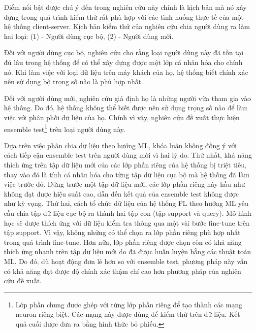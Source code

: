 Điểm nối bật được chú ý đến trong nghiên cứu này chính là kịch bản mà nó xây dựng trong quá trình kiểm thử rất phù hợp với các tình huống thực tế của một hệ thống client-server. Kịch bản kiểm thử của nghiên cứu \cite{liang2020think} chia người dùng ra làm hai loại: (1) - Người dùng cục bộ, (2) - Người dùng mới.

Đối với người dùng cục bộ, nghiên cứu cho rằng loại người dùng này đã tồn tại đủ lâu trong hệ thống để có thể xây dựng được một lớp cá nhân hóa cho chính nó. Khi làm việc với loại dữ liệu trên máy khách của họ, hệ thống biết chính xác nên sử dụng bộ trọng số nào là phù hợp nhất.

\label{ensemble_test}
Đối với người dùng mới, nghiên cứu giả định họ là những người vừa tham gia vào hệ thống. Do đó, hệ thống không thể biết được nên sử dụng trọng số nào để làm việc với phân phối dữ liệu của họ. Chính vì vậy, nghiên cứu đề xuất thực hiện ensemble test\footnote{Lớp phần chung được ghép với từng lớp phần riêng để tạo thành các mạng neuron riêng biệt. Các mạng này được dùng để kiểm thử trên dữ liệu. Kết quả cuối được đưa ra bằng hình thức bỏ phiếu.} trên loại người dùng này.

Dựa trên việc phân chia dữ liệu theo hướng ML, khóa luận không đồng ý với cách tiếp cận ensemble test trên người dùng mới vì hai lý do. Thứ nhất, khả năng thích ứng trên tập dữ liệu mới của các lớp phần riêng của hệ thống bị triệt tiêu, thay vào đó là tính cá nhân hóa cho từng tập dữ liệu cục bộ mà hệ thống đã làm việc trước đó. Đứng trước một tập dữ liệu mới, các lớp phần riêng này hầu như không đạt được hiệu suất cao, dẫn đến kết quả của ensemble test không được như kỳ vọng. Thứ hai, cách tổ chức dữ liệu của hệ thống FL theo hướng ML yêu cầu chia tập dữ liệu cục bộ ra thành hai tập con (tập support và query). Mô hình học sẽ được thích ứng với dữ liệu kiểm tra thông qua một vài bước fine-tune trên tập support. Vì vậy, không những có thể chọn ra lớp phần riêng phù hợp nhất trong quá trình fine-tune. Hơn nữa, lớp phần riêng được chọn còn có khả năng thích ứng nhanh trên tập dữ liệu mới do đã được huấn luyện bằng các thuật toán ML. Do đó, dù hoạt động đơn lẻ hơn so với ensemble test, phương pháp này vẫn có khả năng đạt được độ chính xác thậm chí cao hơn phương pháp của nghiên cứu \cite{liang2020think} đề xuất.



